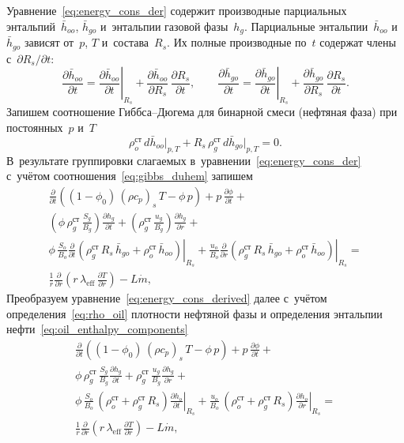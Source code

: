 \documentclass[12pt,a4paper]{article}
\newcommand{\divr}[1]{\frac{1}{r}\frac{\partial}{\partial r}\!\left(r\,#1\right)}
\newcommand{\pdt}[1]{\frac{\partial #1}{\partial t}}
\newcommand{\pdr}[1]{\frac{\partial #1}{\partial r}}
\newcommand{\mdot}{\dot{m}}
\newcommand{\leff}{\lambda_{\mathrm{eff}}}
\begin{document}
Уравнение~\eqref{eq:energy_cons_der} содержит производные парциальных
энтальпий~$\bar{h}_{oo}$, $\bar{h}_{go}$ и~энтальпии газовой
фазы~$h_g$. Парциальные энтальпии~$\bar{h}_{oo}$ и~$\bar{h}_{go}$ зависят
от~$p$, $T$ и~состава~$R_s$. Их полные производные по~$t$
содержат члены с~$\partial R_s/\partial t$:
\[
  \pdt{\bar{h}_{oo}} = \left.\pdt{\bar{h}_{oo}}\right|_{R_s}
    + \frac{\partial\bar{h}_{oo}}{\partial R_s}\,\pdt{R_s},
  \qquad
  \pdt{\bar{h}_{go}} = \left.\pdt{\bar{h}_{go}}\right|_{R_s}
    + \frac{\partial\bar{h}_{go}}{\partial R_s}\,\pdt{R_s}.
\]
Запишем соотношение Гиббса--Дюгема для бинарной смеси (нефтяная фаза)
при постоянных~$p$ и~$T$
\begin{equation}\label{eq:gibbs_duhem}
  \rho_o^{\text{ст}}\,d\bar{h}_{oo}\big|_{p,T}
  + R_s\,\rho_g^{\text{ст}}\,d\bar{h}_{go}\big|_{p,T} = 0.
\end{equation}
В~результате группировки слагаемых в~уравнении~\eqref{eq:energy_cons_der}
с~учётом соотношения~\eqref{eq:gibbs_duhem} запишем
\begin{multline}\label{eq:energy_cons_derived}
  \pdt{}\left( (1 - \phi_0)\,(\rho c_p)_s\,T - \phi\,p\right) + p\,\pdt{\phi}
      +
      \\
    \left(\phi\,\rho_g^{\text{ст}}\,
      \frac{S_g}{B_g}\right)
    \pdt{h_g}\!
    + \left(\rho_g^{\text{ст}}\,
      \frac{u_g}{B_g}\right)\pdr{h_g}  +
      \\
    \phi\,\frac{S_o}{B_o}
    \left.\pdt{}\left(\rho_g^{\text{ст}}\,R_s\,\bar{h}_{go} + \rho_o^{\text{ст}}\,\bar{h}_{oo}\right)\right|_{R_s}
    +
      \frac{u_o}{B_o}\left.\pdr{}\left(\rho_g^{\text{ст}}\,R_s\,\bar{h}_{go} + \rho_o^{\text{ст}}\,\bar{h}_{oo}\right) \right|_{R_s} =
  \\
  \divr{\leff\,\pdr{T}} - L\mdot,
\end{multline}
Преобразуем уравнение~\eqref{eq:energy_cons_derived} далее с~учётом
определения~\eqref{eq:rho_oil} плотности нефтяной фазы и
определения энтальпии нефти~\eqref{eq:oil_enthalpy_components}
\begin{multline}\label{eq:energy_cons_derived2}
  \pdt{}\left( (1 - \phi_0)\,(\rho c_p)_s\,T - \phi\,p\right) + p\,\pdt{\phi}
      +
      \\
    \phi\,\rho_g^{\text{ст}}\,
      \frac{S_g}{B_g}
    \pdt{h_g}\!
    + \rho_g^{\text{ст}}\,
      \frac{u_g}{B_g}\pdr{h_g}  +
      \\
    \phi\,\frac{S_o}{B_o}\,(\rho_o^{\text{ст}}+\rho_g^{\text{ст}}\,R_s)
    \left.\pdt{h_o}\right|_{R_s}
    +
      \frac{u_o}{B_o}\,(\rho_o^{\text{ст}}+\rho_g^{\text{ст}}\,R_s)\left.\pdr{h_o}\right|_{R_s} =
  \\
  \divr{\leff\,\pdr{T}} - L\mdot,
\end{multline}
\end{document}
